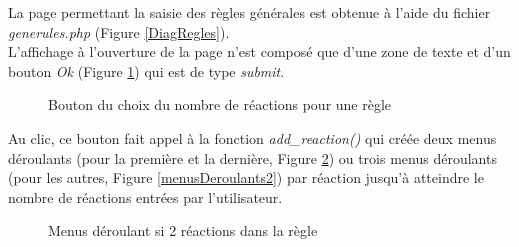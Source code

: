 La page permettant la saisie des règles générales est obtenue à l'aide du fichier \emph{generules.php} (Figure \ref{DiagRegles}).\\
L'affichage à l'ouverture de la page n'est composé que d'une zone de texte et d'un bouton \emph{Ok} (Figure \ref{boutonOK}) qui est de type \textit{submit}. 

\begin{figure}[!ht]
	\begin{center}
		\caption{Bouton du choix du nombre de réactions pour une règle}
  		\label{boutonOK}
  	\end{center}	
\end{figure}

Au clic, ce bouton fait appel à la fonction \emph{add\_reaction()} qui créée  deux menus déroulants (pour la première et la dernière, Figure \ref{menusDeroulants1}) ou trois menus déroulants (pour les autres, Figure \ref{menusDeroulants2}) par réaction jusqu'à atteindre le nombre de réactions entrées par l'utilisateur. 

\begin{figure}[!ht]
	\begin{center}
		\caption{Menus déroulant si 2 réactions dans la règle}
  		\label{menusDeroulants1}
  	\end{center}	
\end{figure}

